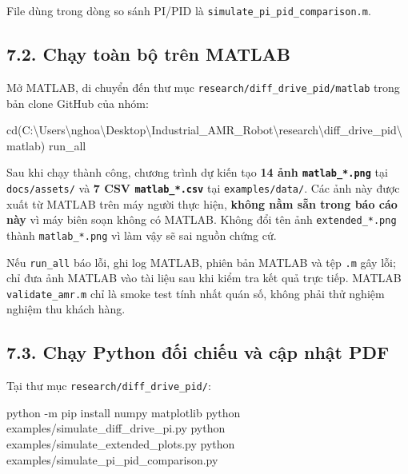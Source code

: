 \documentclass[
  12pt,
  a4paper,
]{article}
\newenvironment{Shaded}{}{}
\newcommand{\FunctionTok}[1]{\textcolor[rgb]{0.02,0.16,0.49}{#1}}
\newcommand{\NormalTok}[1]{#1}
\newcommand{\OperatorTok}[1]{\textcolor[rgb]{0.40,0.40,0.40}{#1}}
\newcommand{\SpecialStringTok}[1]{\textcolor[rgb]{0.73,0.40,0.53}{#1}}
\newcommand{\VariableTok}[1]{\textcolor[rgb]{0.10,0.09,0.49}{#1}}
\begin{document}
File dùng trong dòng so sánh PI/PID là
\texttt{simulate\_pi\_pid\_comparison.m}.

\subsection{7.2. Chạy toàn bộ trên
MATLAB}\label{chux1ea1y-touxe0n-bux1ed9-truxean-matlab}

Mở MATLAB, di chuyển đến thư mục
\texttt{research/diff\_drive\_pid/matlab} trong bản clone GitHub của
nhóm:

\begin{Shaded}
\begin{Highlighting}[]
\VariableTok{cd}\NormalTok{(}\SpecialStringTok{\textquotesingle{}C:\textbackslash{}Users\textbackslash{}nghoa\textbackslash{}Desktop\textbackslash{}Industrial\_AMR\_Robot\textbackslash{}research\textbackslash{}diff\_drive\_pid\textbackslash{}matlab\textquotesingle{}}\NormalTok{)}
\VariableTok{run\_all}
\end{Highlighting}
\end{Shaded}

Sau khi chạy thành công, chương trình dự kiến tạo \textbf{14 ảnh
\texttt{matlab\_*.png}} tại \texttt{docs/assets/} và \textbf{7 CSV
\texttt{matlab\_*.csv}} tại \texttt{examples/data/}. Các ảnh này được
xuất từ MATLAB trên máy người thực hiện, \textbf{không nằm sẵn trong báo
cáo này} vì máy biên soạn không có MATLAB. Không đổi tên ảnh
\texttt{extended\_*.png} thành \texttt{matlab\_*.png} vì làm vậy sẽ sai
nguồn chứng cứ.

Nếu \texttt{run\_all} báo lỗi, ghi log MATLAB, phiên bản MATLAB và tệp
\texttt{.m} gây lỗi; chỉ đưa ảnh MATLAB vào tài liệu sau khi kiểm tra
kết quả trực tiếp. MATLAB \texttt{validate\_amr.m} chỉ là smoke test
tính nhất quán số, không phải thử nghiệm nghiệm thu khách hàng.

\subsection{7.3. Chạy Python đối chiếu và cập nhật
PDF}\label{chux1ea1y-python-ux111ux1ed1i-chiux1ebfu-vuxe0-cux1eadp-nhux1eadt-pdf}

Tại thư mục \texttt{research/diff\_drive\_pid/}:

\begin{Shaded}
\begin{Highlighting}[]
\NormalTok{python }\OperatorTok{{-}}\NormalTok{m pip install numpy matplotlib}
\NormalTok{python examples}\OperatorTok{/}\NormalTok{simulate\_diff\_drive\_pi}\OperatorTok{.}\FunctionTok{py}
\NormalTok{python examples}\OperatorTok{/}\NormalTok{simulate\_extended\_plots}\OperatorTok{.}\FunctionTok{py}
\NormalTok{python examples}\OperatorTok{/}\NormalTok{simulate\_pi\_pid\_comparison}\OperatorTok{.}\FunctionTok{py}
\end{Highlighting}
\end{Shaded}
\end{document}
